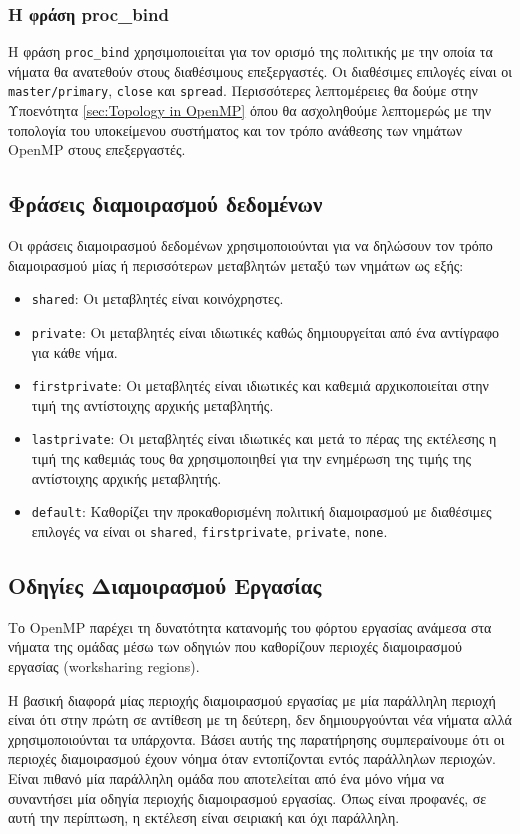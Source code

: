 \subsubsection{Η φράση proc\_bind}
Η φράση \texttt{proc\_bind} χρησιμοποιείται για τον ορισμό της πολιτικής με την οποία τα νήματα θα ανατεθούν στους διαθέσιμους επεξεργαστές. Οι διαθέσιμες επιλογές είναι οι \texttt{master/primary}, \texttt{close} και \texttt{spread}. Περισσότερες λεπτομέρειες θα δούμε στην Υποενότητα \ref{sec:Topology in OpenMP} όπου θα ασχοληθούμε λεπτομερώς με την τοπολογία του υποκείμενου συστήματος και τον τρόπο ανάθεσης των νημάτων OpenMP στους επεξεργαστές.


\subsection{Φράσεις διαμοιρασμού δεδομένων}
\label{ssec:Data sharing clauses}
Οι φράσεις διαμοιρασμού δεδομένων χρησιμοποιούνται για να δηλώσουν τον τρόπο διαμοιρασμού μίας ή περισσότερων μεταβλητών μεταξύ των νημάτων ως εξής:
\begin{itemize}
	\item \texttt{shared}: Οι μεταβλητές είναι κοινόχρηστες.
	\item \texttt{private}: Οι μεταβλητές είναι ιδιωτικές καθώς δημιουργείται από ένα αντίγραφο για κάθε νήμα.
	\item \texttt{firstprivate}: Οι μεταβλητές είναι ιδιωτικές και καθεμιά αρχικοποιείται στην τιμή της αντίστοιχης αρχικής μεταβλητής.
	\item \texttt{lastprivate}: Οι μεταβλητές είναι ιδιωτικές και μετά το πέρας της εκτέλεσης η τιμή της καθεμιάς τους θα χρησιμοποιηθεί για την ενημέρωση της τιμής της αντίστοιχης αρχικής μεταβλητής.
	\item \texttt{default}: Καθορίζει την προκαθορισμένη πολιτική διαμοιρασμού με διαθέσιμες επιλογές να είναι οι \texttt{shared}, \texttt{firstprivate}, \texttt{private}, \texttt{none}.
\end{itemize}


\subsection{Οδηγίες Διαμοιρασμού Εργασίας}
\label{ssec:Work sharing directives}
Το OpenMP παρέχει τη δυνατότητα κατανομής του φόρτου εργασίας ανάμεσα στα νήματα της ομάδας μέσω των οδηγιών που καθορίζουν περιοχές διαμοιρασμού εργασίας (worksharing regions).

Η βασική διαφορά μίας περιοχής διαμοιρασμού εργασίας με μία παράλληλη περιοχή είναι ότι στην πρώτη σε αντίθεση με τη δεύτερη, δεν δημιουργούνται νέα νήματα αλλά χρησιμοποιούνται τα υπάρχοντα. Βάσει αυτής της παρατήρησης συμπεραίνουμε ότι οι περιοχές διαμοιρασμού έχουν νόημα όταν εντοπίζονται εντός παράλληλων περιοχών. Είναι πιθανό μία παράλληλη ομάδα που αποτελείται από ένα μόνο νήμα να συναντήσει μία οδηγία περιοχής διαμοιρασμού εργασίας. Όπως είναι προφανές, σε αυτή την περίπτωση, η εκτέλεση είναι σειριακή και όχι παράλληλη.

